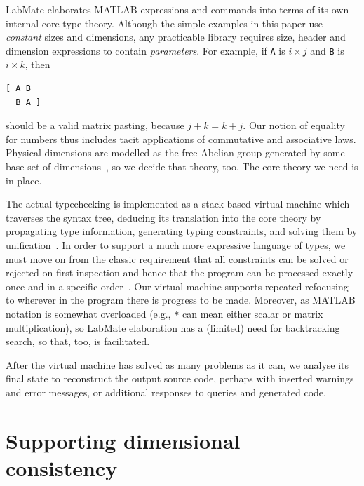 \documentclass{IMEKO2024}
\newcommand{\bsl}{\texttt{\symbol{92}}}
\begin{document}
LabMate elaborates MATLAB expressions and commands into terms of its own internal core type theory.
%
Although the simple examples in this paper use \emph{constant} sizes and dimensions, any practicable library requires size, header and dimension expressions to contain \emph{parameters}.
%
For example, if \texttt{A} is $i\times j$ and \texttt{B} is $i\times k$, then
\begin{verbatim}
[ A B
  B A ]
\end{verbatim}
should be a valid matrix pasting, because $j+k = k+j$. Our notion of equality for numbers thus includes tacit applications of commutative and associative laws. %
%
Physical dimensions are modelled as the free Abelian group generated by some base set of dimensions~\cite{dim.group}, so we decide that theory, too.
%
The core theory we need is in place.

The actual typechecking is implemented as a stack based virtual machine which traverses the syntax tree, deducing its translation into the core theory by propagating type information, generating typing constraints, and solving them by unification~\cite{robinson65}.
%
In order to support a much more expressive language of types, we must move on from the classic requirement that all constraints can be solved or rejected on first inspection and hence that the program can be processed exactly once and in a specific order~\cite{damas.milner}.
%
Our virtual machine supports repeated refocusing to wherever in the program there is progress to be made.
%
Moreover, as MATLAB notation is somewhat overloaded (e.g., \texttt{*} can mean either scalar or matrix multiplication), so LabMate elaboration has a (limited) need for backtracking search, so that, too, is facilitated.

%

After the virtual machine has solved as many problems as it can, we analyse its final state to reconstruct the output source code, perhaps with inserted warnings and error messages, or additional responses to queries and generated code.

\section{Supporting dimensional consistency}
\label{sec:example-revisited}
\end{document}

